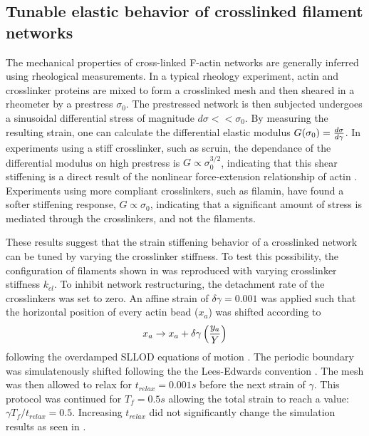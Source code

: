 \documentclass[12pt]{article}
\begin{document}
\subsection{Tunable elastic behavior of crosslinked filament networks}
\par
The mechanical properties of cross-linked F-actin networks are generally
inferred using rheological measurements\cite{gardel2004,koenderink2006,kasza2009,lin2010}.
In a typical rheology experiment, actin and crosslinker proteins are mixed to
form a crosslinked mesh and then sheared in a rheometer by a prestress
$\sigma_0$. The prestressed network is then subjected undergoes a sinusoidal
differential stress of magnitude $d\sigma<<\sigma_0$. By measuring the resulting
strain, one can calculate the differential elastic modulus
$G(\sigma_0) = {d\sigma\over d\gamma}$. In experiments using a stiff
crosslinker, such as scruin, the dependance of the differential modulus on high
prestress is $G\propto\sigma_0^{3/2}$, indicating that this shear stiffening is
a direct result of the nonlinear force-extension relationship of actin 
\cite{gardel2004,lin2010}. Experiments using more compliant crosslinkers,
such as filamin, have found a softer stiffening response, $G\propto\sigma_0$,
indicating that a significant amount of stress is mediated through the
crosslinkers, and not the filaments\cite{kasza2009}.
\par 
These results suggest that the strain stiffening behavior of a crosslinked 
network can be tuned by varying the crosslinker
stiffness. To test this possibility, the configuration of filaments shown in 
 was reproduced with varying crosslinker stiffness $k_{cl}$. 
To inhibit network restructuring, the detachment rate of the crosslinkers was 
set to zero. An affine strain of $\delta\gamma=0.001$ was applied such that the
horizontal position of every actin bead ($x_a$) was shifted according to  
\begin{equation}
  x_a \rightarrow x_a + \delta\gamma \left( {y_a\over Y} \right)
  \label{eqn:sllod}
\end{equation} 
following the overdamped SLLOD equations of motion \cite{evans1984}. The 
periodic boundary was simulatenously shifted following the the Lees-Edwards 
convention \cite{allen}. The mesh was then allowed to relax for
$t_{relax} =0.001 s$ before the next strain of $\gamma$. This protocol was 
continued for $T_f=0.5s$ allowing the total strain to reach a value:
$\gamma T_f/t_{relax}=0.5$. Increasing $t_{relax}$ did not significantly change 
the simulation results as seen in .  
\end{document}
